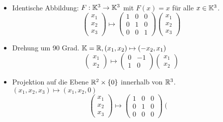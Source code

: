 \begin{bsp}\
	\begin{itemize}
		\item  Identische Abbildung: $ F : \mathbb K^3 \to \mathbb K^3 $ mit $ F(x) = x $ für alle $ x \in \mathbb K^3 $.
		\begin{equation*}
			\begin{pmatrix} x_1 \\ x_2 \\ x_3 \end{pmatrix}  \mapsto \begin{pmatrix} 1 & 0 & 0 \\ 0 & 1 & 0 \\ 0 & 0 & 1 \end{pmatrix} \begin{pmatrix} x_1 \\ x_2 \\ x_3 \end{pmatrix}
		\end{equation*}
		\item Drehung um 90 Grad. $ \mathbb K = \mathbb R, (x_1,x_2) \mapsto (-x_2,x_1) $
		\begin{equation*}
			\left( \begin{matrix}
			x_1 \\ 
			x_2
			\end{matrix} \right)
			\mapsto
			\left( \begin{matrix}
			0 & -1 \\ 
			1 & 0
			\end{matrix} \right)
			\left( \begin{matrix}
			x_1 \\ 
			x_2
			\end{matrix} \right)
		\end{equation*}
		\item Projektion auf die Ebene $\mathbb R^2 \times \{0\}$ innerhalb von $\mathbb R^3$. $ (x_1,x_2,x_3) \mapsto (x_1,x_2,0) $
		\begin{equation*}
			\left( \begin{matrix}
			x_1 \\ 
			x_2 \\
			x_3
			\end{matrix} \right)
			\mapsto
			\left( \begin{matrix}
			1 & 0 & 0 \\ 
			0 & 1 & 0 \\
			0 & 0 & 0
			\end{matrix} \right)
			\left( \begin{matrix}

\end{matrix}
\end{equation*}
\end{itemize}
\end{bsp}
